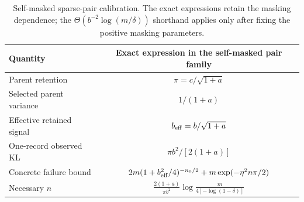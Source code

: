 \begin{table}[t]
\centering
\small
\renewcommand{\arraystretch}{1.16}
\setlength{\tabcolsep}{6pt}
\begin{tabularx}{\textwidth}{@{}L{0.72}C{1.28}@{}}
\toprule
Quantity & Exact expression in the self-masked pair family \\
\midrule
Parent retention & $\pi=c/\sqrt{1+a}$ \\
Selected parent variance & $1/(1+a)$ \\
Effective retained signal & $b_{\rm eff}=b/\sqrt{1+a}$ \\
One-record observed KL & $\pi b^2/[2(1+a)]$ \\
Concrete failure bound & $2m(1+b_{\rm eff}^2/4)^{-n_0/2}+m\exp(-\eta^2n\pi/2)$ \\
Necessary $n$ & $\frac{2(1+a)}{\pi b^2}\log\!\frac{m}{4[-\log(1-\delta)]}$ \\
\bottomrule
\end{tabularx}
\caption{Self-masked sparse-pair calibration. The exact expressions retain the masking dependence; the $\Theta(b^{-2}\log(m/\delta))$ shorthand applies only after fixing the positive masking parameters.}
\label{tab:information-rate-summary}
\end{table}
